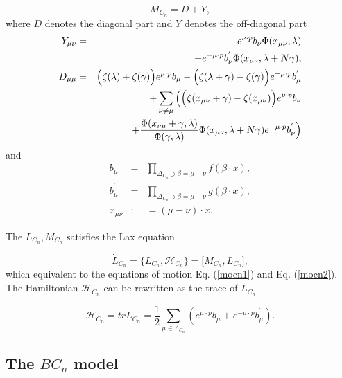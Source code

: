 \documentclass[a4paper,12pt]{article}
\begin{document}
\begin{equation}
M_{C_{n}}=D+Y,	\label{Mmatrix}
\end{equation}
where $D$ denotes the diagonal part and $Y$ denotes the
off-diagonal part
\begin{eqnarray}
Y_{\mu \nu } &=&e^{\nu \cdot p}b_{\nu }\Phi (x_{\mu \nu
},\lambda )
\nonumber \\
&&+e^{-\mu \cdot p}b_{\nu }^{^{\prime }}\Phi (x_{\mu \nu
},\lambda +N
\mbox{$
$}\gamma ),  \label{elliY} \\ D_{\mu \mu } &=&\Big(\zeta
(\lambda )+\zeta (\gamma )\Big)e^{\mu \cdot p}b_{\mu
}-\Big(\zeta (\lambda +\gamma )-\zeta (\gamma )\Big)e^{-\mu
\cdot p}b_{\mu }^{^{\prime }}  \nonumber \\ &&+\sum_{\nu
\neq \mu }\Big(\Big(\zeta (x_{\mu \nu }+\gamma )-\zeta
(x_{\mu
\nu })\Big)e^{\nu \cdot p}b_{\nu }  \nonumber \\
&&+\frac{\Phi (x_{\nu \mu }+\gamma ,\lambda )}{\Phi (\gamma
,\lambda )}\Phi (x_{\mu \nu },\lambda +N\gamma )e^{-\mu
\cdot p}b_{\nu }^{^{\prime }}\Big)
\label{elliD}
\end{eqnarray}
and
\begin{eqnarray}
b_{\mu } &=&\prod_{\Delta _{C_{n}}\ni \beta =\mu -\nu
}f(\beta \cdot x),
\nonumber \\
b_{\mu }^{^{\prime }} &=&\prod_{\Delta _{C_{n}}\ni \beta
=\mu -\nu }g(\beta
\cdot x),  \label{cnaux} \\
x_{\mu \nu } &:&=(\mu -\nu )\cdot x.  \nonumber
\end{eqnarray}

The $L_{C_{n}},M_{C_{n}}$ satisfies the Lax equation

\begin{equation}
\dot{L}_{C_{n}}=\{L_{C_{n}},\mathcal{H}_{C_{n}}\}=\lbrack
M_{C_{n}},L_{C_{n}}\rbrack ,
\end{equation}
which equivalent to the equations of motion Eq.
(\ref{mocn1}) and Eq. (\ref {mocn2}). The Hamiltonian
$\mathcal{H}_{C_{n}}$ can be rewritten as the trace of
$L_{C_{n}}$

\begin{equation}
\mathcal{H}_{C_{n}}=trL_{C_{n}}=\frac{1}{2}\sum_{\mu \in \Lambda
_{C_{n}}}(e^{\mu \cdot p}b_{\mu }+e^{-\mu \cdot p}b_{\mu }^{^{\prime }}).
\end{equation}

\subsection{The $BC_{n}$ model}
\end{document}
